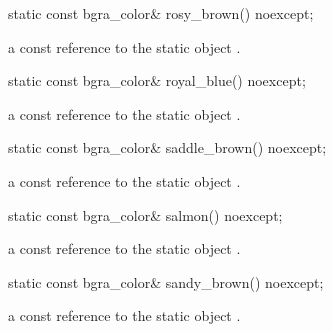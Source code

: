 \begin{itemdecl}
static const bgra_color& rosy_brown() noexcept;
\end{itemdecl}
\begin{itemdescr}
\pnum
\returns
a const reference to the static  object .
\end{itemdescr}

\begin{itemdecl}
static const bgra_color& royal_blue() noexcept;
\end{itemdecl}
\begin{itemdescr}
\pnum
\returns
a const reference to the static  object .
\end{itemdescr}

\begin{itemdecl}
static const bgra_color& saddle_brown() noexcept;
\end{itemdecl}
\begin{itemdescr}
\pnum
\returns
a const reference to the static  object .
\end{itemdescr}

\begin{itemdecl}
static const bgra_color& salmon() noexcept;
\end{itemdecl}
\begin{itemdescr}
\pnum
\returns
a const reference to the static  object .
\end{itemdescr}

\begin{itemdecl}
static const bgra_color& sandy_brown() noexcept;
\end{itemdecl}
\begin{itemdescr}
\pnum
\returns
a const reference to the static  object .
\end{itemdescr}

